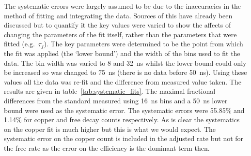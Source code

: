 The systematic errors were largely assumed to be due to the inaccuracies in the method of fitting and integrating the data. Sources of this have already been discussed but to quantify it the key values were varied to show the affects of changing the parameters of the fit itself, rather than the parameters that were fitted (e.g.\ \(\tau_f\)). The key parameters were determined to be the point from which the fit was applied (the `lower bound') and the width of the bins used to fit the data. The bin width was varied to 8 and 32~ns whilst the lower bound could only be increased so was changed to 75~ns (there is no data before 50~ns). Using these values all the data was re-fit and the difference from measured value taken. The results are given in table~\ref{tab:systematic_fits}. The maximal fractional differences from the standard measured using 16~ns bins and a 50~ns lower bound were used as the systematic error. The systematic errors were 55.85\% and 1.14\% for copper and free decay counts respectively. As is clear the systematics on the copper fit is much higher but this is what we would expect. The systematic error on the copper count is included in the adjusted rate but not for the free rate as the error on the efficiency is the dominant term then.

